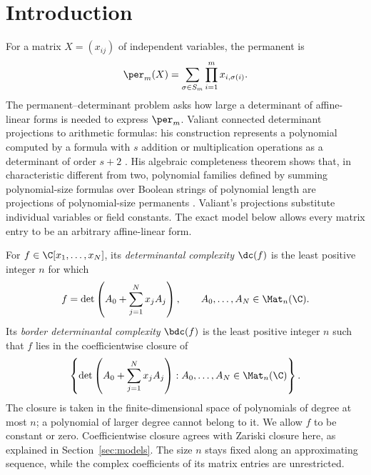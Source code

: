 \begin{abstract}
We prove that the complex border determinantal complexity of the $m\times m$
permanent is $\Omega(m^3)$, allowing arbitrary affine-linear determinant
representations and coefficientwise limits. It also gives cubic lower bounds
for exact determinantal complexity and for the numbers of vertices and edges
in affine-linear algebraic branching programs, including coefficientwise
limits with a fixed vertex or edge budget.
\end{abstract}

\section{Introduction}
\label{sec:introduction}

For a matrix $X=(x_{ij})$ of independent variables, the permanent is
\[
 \per_m(X)=\sum_{\sigma\in S_m}\prod_{i=1}^m x_{i,\sigma(i)}.
\]
The permanent--determinant problem asks how large a determinant of
affine-linear forms is needed to express $\per_m$. Valiant connected
determinant projections to arithmetic formulas: his construction represents
a polynomial computed by a formula with $s$ addition or multiplication
operations as a determinant of order $s+2$
\cite[Theorem~1]{Valiant1979Algebra}. His algebraic completeness theorem
shows that, in characteristic different from two, polynomial families
defined by summing polynomial-size formulas over Boolean strings of
polynomial length are projections of polynomial-size permanents
\cite[Theorem~2]{Valiant1979Algebra}. Valiant's projections substitute
individual variables or field constants. The exact model below allows
every matrix entry to be an arbitrary affine-linear form.

For $f\in\C[x_1,\ldots,x_N]$, its \emph{determinantal complexity}
$\dc(f)$ is the least positive integer $n$ for which
\[
 f=\det\left(A_0+\sum_{j=1}^N x_jA_j\right),
 \qquad A_0,\ldots,A_N\in\Mat_n(\C).
\]
Its \emph{border determinantal complexity} $\bdc(f)$ is the least positive
integer $n$ such that $f$ lies in the coefficientwise closure of
\begin{equation}
 \left\{\det\left(A_0+\sum_{j=1}^N x_jA_j\right):
 A_0,\ldots,A_N\in\Mat_n(\C)\right\}.
 \label{eq:border-definition}
\end{equation}
The closure is taken in the finite-dimensional space of polynomials of
degree at most $n$; a polynomial of larger degree cannot belong to it.
We allow $f$ to be constant or zero. Coefficientwise closure agrees with
Zariski closure here, as explained in Section~\ref{sec:models}. The size
$n$ stays fixed along an approximating sequence, while the complex
coefficients of its matrix entries are unrestricted.

